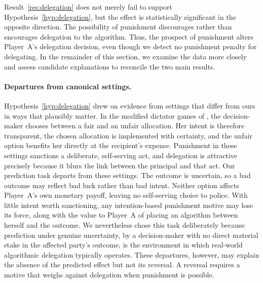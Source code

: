 Result~\ref{res:delegation} does not merely fail to support Hypothesis~\ref{hyp:delegation}, but the effect is statistically significant in the opposite direction. The possibility of punishment discourages rather than encourages delegation to the algorithm. Thus, the prospect of punishment alters Player~A's delegation decision, even though we detect no punishment penalty for delegating. In the remainder of this section, we examine the data more closely and assess candidate explanations to reconcile the two main results.

\paragraph{Departures from canonical settings.}

Hypothesis~\ref{hyp:delegation} drew on evidence from settings that differ from ours in ways that plausibly matter. In the modified dictator games of \citet{bartling_shifting_2012, coffman_intermediation_2011, hamman_self-interest_2010, oexl_shifting_2013}, the decision-maker chooses between a fair and an unfair allocation. Her intent is therefore transparent, the chosen allocation is implemented with certainty, and the unfair option benefits her directly at the recipient's expense. Punishment in these settings sanctions a deliberate, self-serving act, and delegation is attractive precisely because it blurs the link between the principal and that act. Our prediction task departs from these settings. The outcome is uncertain, so a bad outcome may reflect bad luck rather than bad intent. Neither option affects Player~A's own monetary payoff, leaving no self-serving choice to police. With little intent worth sanctioning, any intention-based punishment motive may lose its force, along with the value to Player~A of placing an algorithm between herself and the outcome. We nevertheless chose this task deliberately because prediction under genuine uncertainty, by a decision-maker with no direct material stake in the affected party's outcome, is the environment in which real-world algorithmic delegation typically operates. These departures, however, may explain the absence of the predicted effect but not its reversal. A reversal requires a motive that weighs against delegation when punishment is possible.


